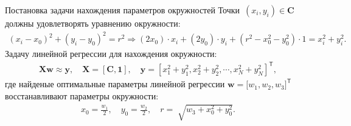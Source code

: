 \documentclass[10pt,pdf,hyperref={unicode}]{beamer}
\begin{document}
\begin{frame}[shrink=5]{Постановка задачи нахождения параметров окружностей}
Точки~$\left(x_i, y_i\right)\in\textbf{C}$ должны удовлетворять уравнению окружности:
\begin{equation*}
\begin{aligned}
\left(x_i - x_0\right)^{2}+\left(y_i-y_0\right)^2 = r^2 \Rightarrow (2x_0)\cdot x_i + (2y_0)\cdot y_i+(r^2-x_0^2-y_0^2)\cdot1 = x_{i}^2 + y_{i}^2.
\end{aligned}
\end{equation*}
Задачу линейной регрессии для нахождения окружности:
\begin{equation*}
\begin{aligned}
\textbf{X}\textbf{w} \approx \textbf{y},  \quad \textbf{X} = \left[\textbf{C}, \textbf{1}\right], \quad \textbf{y} = [x_1^2+y_1^2, x_2^2+y_2^2, \cdots, x_N^2+y_N^2]^{\mathsf{T}},
\end{aligned}
\end{equation*}
где найденые оптимальные параметры линейной регрессии $\textbf{w} = \bigr[w_1, w_2, w_3\bigr]^{\mathsf{T}}$ восстанавливают параметры окружности:
\begin{equation*}
\begin{aligned}
x_0 = \frac{w_1}{2}, \quad y_0 = \frac{w_2}{2}, \quad r = \sqrt[]{w_3+x_{0}^{2}+y_{0}^{2}}.
\end{aligned}
\end{equation*}

\end{frame}

\end{document}
